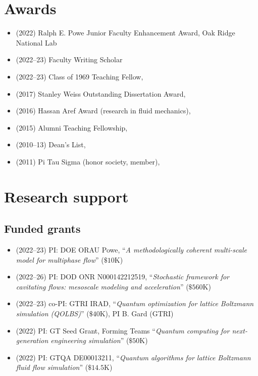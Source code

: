 \section{Awards}

\begin{itemize}
    \item (2022) Ralph E. Powe Junior Faculty Enhancement Award, Oak Ridge National Lab
    \item (2022--23) \GT Faculty Writing Scholar
    \item (2022--23) Class of 1969 Teaching Fellow, \GIT
    \item (2017) Stanley Weiss Outstanding Dissertation Award, \UIUC
    \item (2016) Hassan Aref Award (research in fluid mechanics), \UIUC
    \item (2015) Alumni Teaching Fellowship, \UIUC
    \item (2010--13) Dean's List, \UMD
    \item (2011) Pi Tau Sigma (honor society, member), \UMD
\end{itemize}

\section{Research support}

\subsection{Funded grants}

\begin{itemize}
    \item (2022--23) PI: DOE ORAU Powe, ``\textit{A methodologically coherent multi-scale model for multiphase flow}'' ($\$10$K)
    \item (2022--26) PI: DOD ONR N000142212519, ``\textit{Stochastic framework for cavitating flows: mesoscale modeling and acceleration}'' ($\$560$K)
    \item (2022--23) co-PI: GTRI IRAD, ``\textit{Quantum optimization for lattice Boltzmann simulation (QOLBS)}'' ($\$40$K), PI B. Gard (GTRI)
    \item (2022) PI: GT Seed Grant, Forming Teams ``\textit{Quantum computing for next-generation engineering simulation}'' ($\$50$K)
    \item (2022) PI: GTQA DE00013211, ``\textit{Quantum algorithms for lattice Boltzmann fluid flow simulation}'' ($\$14.5$K)
\end{itemize}

